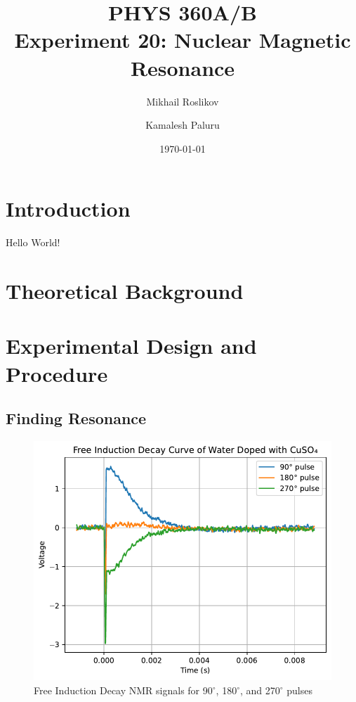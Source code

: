 \documentclass{article}
\title{PHYS 360A/B \\ Experiment 20: Nuclear Magnetic Resonance}
\author{Mikhail Roslikov \and Kamalesh Paluru}
\date{\today}
\begin{document}
\maketitle

\newpage

\tableofcontents

\newpage

\begin{abstract}
\end{abstract}

\newpage

\section{Introduction}\label{sec:introduction}
Hello World!

\newpage

\section{Theoretical Background}\label{sec:theoretical-background}

\newpage

\section{Experimental Design and Procedure}\label{sec:experimental-design-and-procedure}
\subsection{Finding Resonance}\label{subsec:finding-resonance}

\begin{figure}[h]
    \centering
    \includegraphics[scale = 0.78]{./images/B1}
    \caption{Free Induction Decay NMR signals for 90$^{\circ}$, 180$^{\circ}$, and 270$^{\circ}$ pulses}
    \label{fig:B1_FID}
\end{figure}
\end{document}
